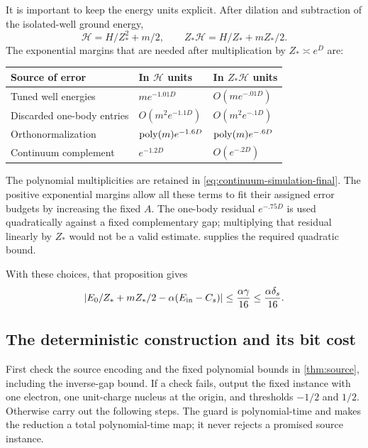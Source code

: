 It is important to keep the energy units explicit. After dilation and subtraction of the isolated-well ground energy,
\begin{equation}\label{eq:units-final}
\mathcal H=H/Z_*^2+m/2,
\qquad Z_*\mathcal H=H/Z_*+mZ_*/2.
\end{equation}
The exponential margins that are needed after multiplication by $Z_*\asymp e^D$ are:
\begin{center}
\begin{tabular}{@{}lll@{}}
\toprule
Source of error & In $\mathcal H$ units & In $Z_*\mathcal H$ units\\
\midrule
Tuned well energies & $m e^{-1.01D}$ & $O(m e^{-.01D})$\\
Discarded one-body entries & $O(m^2 e^{-1.1D})$ & $O(m^2 e^{-.1D})$\\
Orthonormalization & $\operatorname{poly}(m)e^{-1.6D}$ & $\operatorname{poly}(m)e^{-.6D}$\\
Continuum complement & $e^{-1.2D}$ & $O(e^{-.2D})$\\
\bottomrule
\end{tabular}
\end{center}
The polynomial multiplicities are retained in \cref{eq:continuum-simulation-final}. The positive exponential margins allow all these terms to fit their assigned error budgets by increasing the fixed $A$. The one-body residual $e^{-.75D}$ is used quadratically against a fixed complementary gap; multiplying that residual linearly by $Z_*$ would not be a valid estimate.  supplies the required quadratic bound.

With these choices, that proposition gives
\begin{equation}\label{eq:full-final-error}
\left|E_0/Z_*+mZ_*/2-\alpha(E_{\rm in}-C_s)\right|
\le \frac{\alpha\gamma}{16}
\le \frac{\alpha\delta_s}{16}.
\end{equation}

\subsection{The deterministic construction and its bit cost}

First check the source encoding and the fixed polynomial bounds in \cref{thm:source}, including the inverse-gap bound. If a check fails, output the fixed instance with one electron, one unit-charge nucleus at the origin, and thresholds $-1/2$ and $1/2$. Otherwise carry out the following steps. The guard is polynomial-time and makes the reduction a total polynomial-time map; it never rejects a promised source instance.

